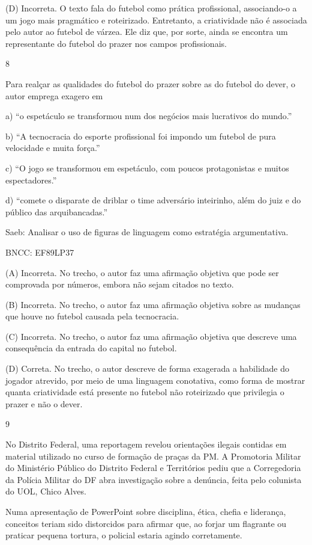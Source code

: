 (D) Incorreta. O texto fala do futebol como prática profissional,
associando-o a um jogo mais pragmático e roteirizado. Entretanto, a
criatividade não é associada pelo autor ao futebol de várzea. Ele diz
que, por sorte, ainda se encontra um representante do futebol do prazer
nos campos profissionais.

\num{8}

Para realçar as qualidades do futebol do prazer sobre as do futebol do
dever, o autor emprega exagero em

a) ``o espetáculo se transformou num dos negócios mais lucrativos do
mundo.''

b) ``A tecnocracia do esporte profissional foi impondo um futebol de
pura velocidade e muita força.''

c) ``O jogo se transformou em espetáculo, com poucos protagonistas e
muitos espectadores.''

d) ``comete o disparate de driblar o time adversário inteirinho, além do
juiz e do público das arquibancadas.''

Saeb: Analisar o uso de figuras de linguagem como estratégia
argumentativa.

BNCC: EF89LP37

(A) Incorreta. No trecho, o autor faz uma afirmação objetiva que pode
ser comprovada por números, embora não sejam citados no texto.

(B) Incorreta. No trecho, o autor faz uma afirmação objetiva sobre as
mudanças que houve no futebol causada pela tecnocracia.

(C) Incorreta. No trecho, o autor faz uma afirmação objetiva que
descreve uma consequência da entrada do capital no futebol.

(D) Correta. No trecho, o autor descreve de forma exagerada a habilidade
do jogador atrevido, por meio de uma linguagem conotativa, como forma de
mostrar quanta criatividade está presente no futebol não roteirizado que
privilegia o prazer e não o dever.

\num{9}

No Distrito Federal, uma reportagem revelou orientações ilegais contidas
em material utilizado no curso de formação de praças da PM. A Promotoria
Militar do Ministério Público do Distrito Federal e Territórios pediu
que a Corregedoria da Polícia Militar do DF abra investigação sobre a
denúncia, feita pelo colunista do UOL, Chico Alves.

Numa apresentação de PowerPoint sobre disciplina, ética, chefia e
liderança, conceitos teriam sido distorcidos para afirmar que, ao forjar
um flagrante ou praticar pequena tortura, o policial estaria agindo
corretamente.

